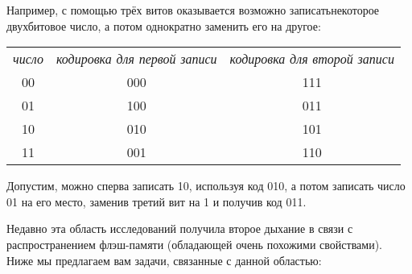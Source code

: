 Например, с помощью трёх витов оказывается возможно записать\linebreak некоторое двухбитовое
число, а потом однократно заменить его на другое:
\begin{center}
\begin{tabular}{ccc}
{\itshape число}    & {\itshape кодировка для первой записи  }   & {\itshape кодировка для второй записи}\\
00       & 000                             & 111\\
01       & 100                             & 011\\
10       & 010                             & 101\\
11       & 001                             & 110
\end{tabular}
\end{center}
Допустим, можно сперва записать 10, используя код 010, а потом записать число 01
на его место, заменив третий вит на 1 и получив код 011.

Недавно эта область исследований получила второе дыхание в связи с распространением
флэш-памяти (обладающей очень похожими свойствами). 
Ниже мы предлагаем вам задачи, связанные с данной областью:

